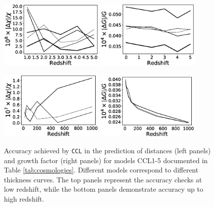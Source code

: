 \documentclass[\docopts]{\docclass}
\newcommand{\ccl}{{\tt CCL}\xspace}
\begin{document}


\begin{figure}
  \centering
  \includegraphics[width=0.45\textwidth]{distances.eps}
  \includegraphics[width=0.45\textwidth]{growth.eps}

  \includegraphics[width=0.45\textwidth]{distances_hiz.eps}
  \includegraphics[width=0.45\textwidth]{growth_hiz.eps}
  \caption{Accuracy achieved by \ccl in the prediction of distances (left panels) and growth factor (right panels) for models CCL1-5 documented in Table \ref{tab:cosmologies}. Different models correspond to different thickness curves. The top panels represent the accuracy checks at low redshift, while the bottom panels demonstrate accuracy up to high redshift.}
  \label{fig:distancegrow}
\end{figure}
\end{document}
